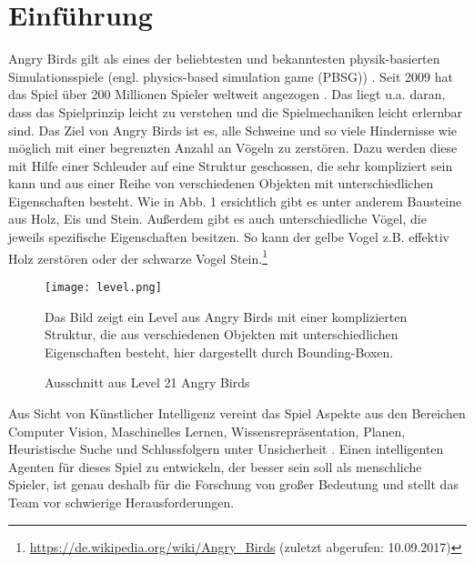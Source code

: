\section{Einführung}
Angry Birds gilt als eines der beliebtesten und bekanntesten physik-basierten Simulationsspiele (engl. physics-based simulation game (PBSG)) \cite{renz2015aibirds}. Seit 2009 hat das Spiel über 200 Millionen Spieler weltweit angezogen \cite{dudeliberately}. Das liegt u.a. daran, dass das Spielprinzip leicht zu verstehen und die Spielmechaniken leicht erlernbar sind. Das Ziel von Angry Birds ist es, alle Schweine und so viele Hindernisse wie möglich mit einer begrenzten Anzahl an Vögeln zu zerstören. Dazu werden diese mit Hilfe einer Schleuder auf eine Struktur geschossen, die sehr kompliziert sein kann und aus einer Reihe von verschiedenen Objekten mit unterschiedlichen Eigenschaften besteht. Wie in Abb. 1 ersichtlich gibt es unter anderem Bausteine aus Holz, Eis und Stein. Au\ss erdem gibt es auch unterschiedliche Vögel, die jeweils spezifische Eigenschaften besitzen. So kann der gelbe Vogel z.B. effektiv Holz zerstören oder der schwarze Vogel Stein.\footnote{\url{https://de.wikipedia.org/wiki/Angry_Birds} (zuletzt abgerufen: 10.09.2017)} 

\begin{figure} [h]
\begin{center}
\texttt{[image: level.png]}
\end{center}
\caption{Ausschnitt aus Level 21 Angry Birds}
\small
Das Bild zeigt ein Level aus Angry Birds mit einer komplizierten Struktur, die aus verschiedenen Objekten mit unterschiedlichen Eigenschaften besteht, hier dargestellt durch Bounding-Boxen.
\end{figure}

Aus Sicht von Künstlicher Intelligenz vereint das Spiel Aspekte aus den Bereichen Computer Vision, Maschinelles Lernen, Wissensrepräsentation, Planen, Heuristische Suche und Schlussfolgern unter Unsicherheit \cite{renz2015aibirds}. Einen intelligenten Agenten für dieses Spiel zu entwickeln, der besser sein soll als menschliche Spieler, ist genau deshalb für die Forschung von gro\ss er Bedeutung und stellt das Team vor schwierige Herausforderungen.
